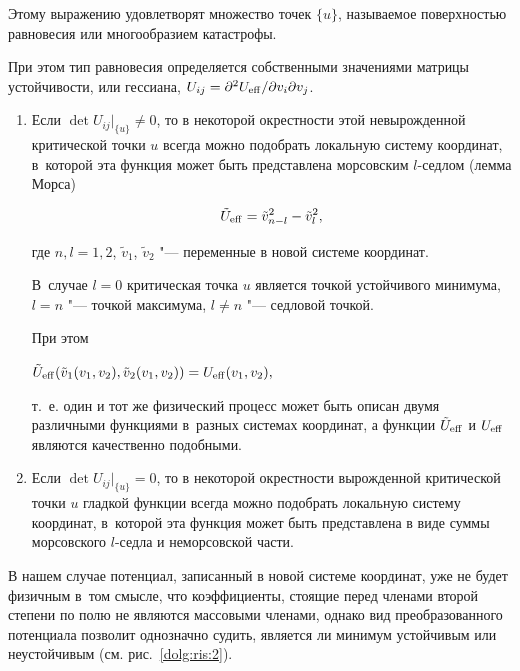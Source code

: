Этому выражению удовлетворят множество точек $\{u\}$, называемое поверхностью равновесия или многообразием катастрофы. 

При этом тип равновесия определяется собственными значениями матрицы устойчивости, или гессиана, $U_{ij} =\partial ^{2} U_{\rm eff} /\partial v_{i} \partial v_{j} $.



\begin{enumerate}

\item[1.] Если $\det U_{ij}|_{\{u\}} \ne 0$, то в некоторой окрестности этой невырожденной критической точки $u$ всегда можно подобрать локальную систему координат, в~которой эта функция может быть представлена морсовским $l$-седлом (лемма Морса)

\begin{equation}

\tilde{U}_{\rm eff}= \tilde{v}_{n-l}^2-\tilde{v}_l^2,

\end{equation}

где $n, l=1, 2$, $\tilde{v }_{1}$, $\tilde{v}_{2} $ "--- переменные в новой системе координат. 

В~случае $l=0$ критическая точка $u$ является точкой устойчивого минимума, $l=n$ "--- точкой максимума, $l \ne n$ "--- седловой точкой.

При этом

$\tilde{U}_{\rm eff} (\tilde{v }_{1} (v _{1} ,v _{2} ),\tilde{v }_{2} (v _{1} ,v _{2} ))=U_{\rm eff} (v _{1} ,v _{2} ),$

т.~е. один и тот же физический процесс может быть описан двумя различными функциями в~разных системах координат, а функции $\tilde{U}_{\rm eff} $ и $U_{\rm eff} $ являются качественно подобными. 



\item[2.] Если $\det U_{ij}|_{\{u\}} = 0$, то в некоторой окрестности вырожденной критической точки $u$ гладкой функции всегда можно подобрать локальную систему координат, в~которой эта функция может быть представлена в виде суммы морсовского $l$-седла и неморсовской части.

\end{enumerate}



В нашем случае потенциал, записанный в новой системе координат, уже не будет физичным в~том смысле, что коэффициенты, стоящие перед членами второй степени по полю не являются массовыми членами, однако вид преобразованного потенциала позволит однозначно судить, является ли минимум устойчивым или неустойчивым (см. рис.~\ref{dolg:ris:2}).



